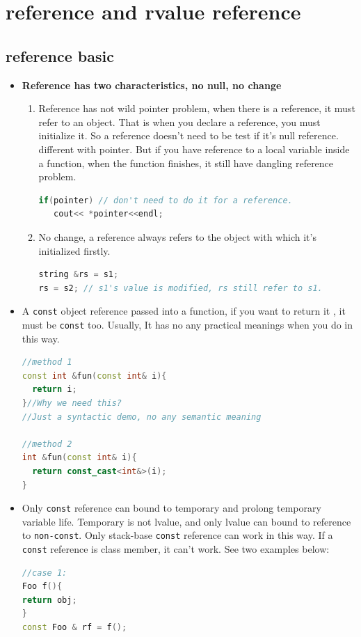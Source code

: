\documentclass[a4paper,12pt,twoside]{book}
\begin{document}
\section{reference and rvalue reference}
\subsection{reference basic}
\begin{itemize}
\item \textbf{Reference has two characteristics, no null, no change}
\begin{enumerate}
\item Reference has not wild pointer problem, when there is a reference, it must refer to an object. That is when you declare a reference, you must initialize it. So a reference doesn't need to be test if it's null reference. different with pointer. But if you have reference to a local variable inside a function, when the function finishes, it still have dangling reference problem. 
\begin{lstlisting}[frame=single, language=c++]
if(pointer) // don't need to do it for a reference.
   cout<< *pointer<<endl;
\end{lstlisting}

\item No change, a reference always refers to the object with which it's initialized firstly.
\begin{lstlisting}[frame=single, language=c++]
string &rs = s1;
rs = s2; // s1's value is modified, rs still refer to s1.
\end{lstlisting}
\end{enumerate}

\item A \texttt{const} object reference passed into a function, if you want to return it , it must be \texttt{const} too. Usually, It has no any practical meanings when you do in this way. 
\begin{lstlisting}[frame=single, language=c++]
//method 1
const int &fun(const int& i){
  return i;
}//Why we need this?
//Just a syntactic demo, no any semantic meaning

//method 2
int &fun(const int& i){
  return const_cast<int&>(i);
}
\end{lstlisting}

\item Only \texttt{const} reference can bound to temporary and prolong temporary variable life. Temporary is not lvalue, and only lvalue can bound to reference to \texttt{non-const}. Only stack-base \texttt{const} reference can work in this way. If a \texttt{const} reference is class member, it can't work.  See two examples below:
\begin{lstlisting}[frame=single, language=c++]
//case 1:
Foo f(){
return obj;
}
const Foo & rf = f();


\end{lstlisting}
\end{itemize}
\end{document}
